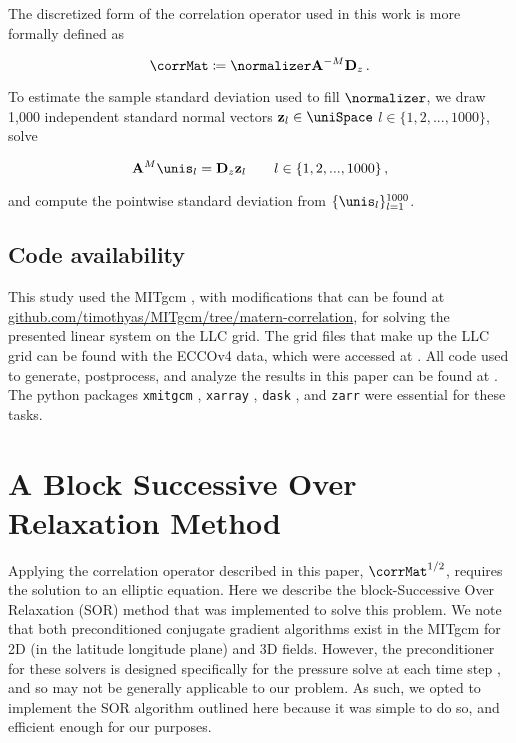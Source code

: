 \documentclass[alpha-refs]{wiley-article}
\begin{document}
The discretized form of the correlation operator used in this work is more
formally defined as
\begin{linenomath*}\begin{equation}
    \corrMat \coloneqq \normalizer \mathbf{A}^{-M} \mathbf{D}_z \, .
    \label{eq:corr_operator_fv}
\end{equation}\end{linenomath*}
To estimate the sample standard deviation used to fill $\normalizer$, we
draw 1,000 independent standard normal vectors $\mathbf{z}_{l} \in \uniSpace$
$l\in \{1, 2, ..., 1000\}$, solve
\begin{linenomath*}\begin{equation}
    \mathbf{A}^{M} \unis_{l} = \mathbf{D}_z \mathbf{z}_{l}
        \qquad l \in \{1, 2, ..., 1000\} \, ,
    \label{eq:sampling}
\end{equation}\end{linenomath*}
and compute the pointwise standard deviation from $\{\unis_{l}\}_{l=1}^{1000}$.

\subsection{Code availability}
\label{ssec:the_code}

This study used the MITgcm \citep{campin_mitgcmmitgcm_2021}, with modifications
that can be found at \url{github.com/timothyas/MITgcm/tree/matern-correlation}, for solving the
presented linear system on the LLC grid.
The grid files that make up the LLC grid can be found with the ECCOv4 data,
which were accessed at \citep{ecco_v4r2}.
All code used to generate, postprocess, and analyze the results in this paper
can be found at \citet{timothy_smith_2022_6878930}.
The python packages \texttt{xmitgcm} \citep{abernathey_2021_5139886},
\texttt{xarray} \citep{hoyer2017xarray}, \texttt{dask} \citep{dask}, and
\texttt{zarr} \citep{alistair_miles_2020_3773450}
were essential for these tasks.

\section{A Block Successive Over Relaxation Method}
\label{sec:block_sor}

Applying the correlation operator described in this paper, $\corrMat^{1/2}$,
requires the solution to an elliptic equation.
Here we describe the block-Successive Over Relaxation (SOR) method that was
implemented to solve this problem.
We note that both preconditioned conjugate gradient algorithms exist in the
MITgcm for 2D (in the latitude longitude plane) and 3D fields.
However, the preconditioner for these solvers is designed specifically for the
pressure solve at each time step \citep{marshall_finite-volume_1997},
and so may not be generally applicable to our problem.
As such, we opted to implement the SOR algorithm outlined here because it was
simple to do so, and efficient enough for our purposes.
\end{document}
